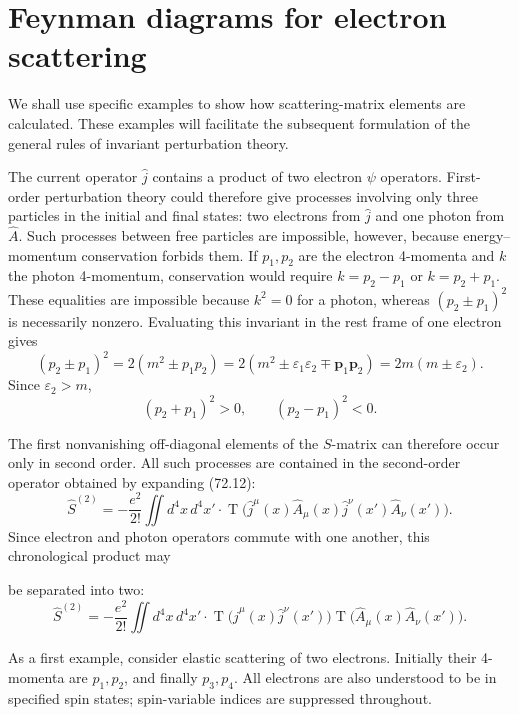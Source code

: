 \section{Feynman diagrams for electron scattering}

We shall use specific examples to show how scattering-matrix elements are calculated. These examples will facilitate the subsequent formulation of the general rules of invariant perturbation theory.

The current operator $\hat j$ contains a product of two electron $\psi$ operators. First-order perturbation theory could therefore give processes involving only three particles in the initial and final states: two electrons from $\hat j$ and one photon from $\hat A$. Such processes between free particles are impossible, however, because energy--momentum conservation forbids them. If $p_1,p_2$ are the electron 4-momenta and $k$ the photon 4-momentum, conservation would require $k=p_2-p_1$ or $k=p_2+p_1$. These equalities are impossible because $k^2=0$ for a photon, whereas $(p_2\pm p_1)^2$ is necessarily nonzero. Evaluating this invariant in the rest frame of one electron gives
\[
(p_2\pm p_1)^2=2(m^2\pm p_1p_2)=2(m^2\pm\varepsilon_1\varepsilon_2\mp\mathbf p_1\mathbf p_2)=2m(m\pm\varepsilon_2).
\]
Since $\varepsilon_2>m$,
\begin{equation}
(p_2+p_1)^2>0,\qquad (p_2-p_1)^2<0.
\tag{73.1}
\end{equation}

The first nonvanishing off-diagonal elements of the $S$-matrix can therefore occur only in second order. All such processes are contained in the second-order operator obtained by expanding (72.12):
\[
\hat S^{(2)}=-\frac{e^2}{2!}\iint d^4x\,d^4x'\cdot
\mathop{\mathrm T}\bigl(\hat j^\mu(x)\hat A_\mu(x)\hat j^\nu(x')\hat A_\nu(x')\bigr).
\]
Since electron and photon operators commute with one another, this chronological product may

be separated into two:
\begin{equation}
\hat S^{(2)}=-\frac{e^2}{2!}\iint d^4x\,d^4x'\cdot
\mathop{\mathrm T}\bigl(\hat j^\mu(x)\hat j^\nu(x')\bigr)
\mathop{\mathrm T}\bigl(\hat A_\mu(x)\hat A_\nu(x')\bigr).
\tag{73.2}
\end{equation}

As a first example, consider elastic scattering of two electrons. Initially their 4-momenta are $p_1,p_2$, and finally $p_3,p_4$. All electrons are also understood to be in specified spin states; spin-variable indices are suppressed throughout.

